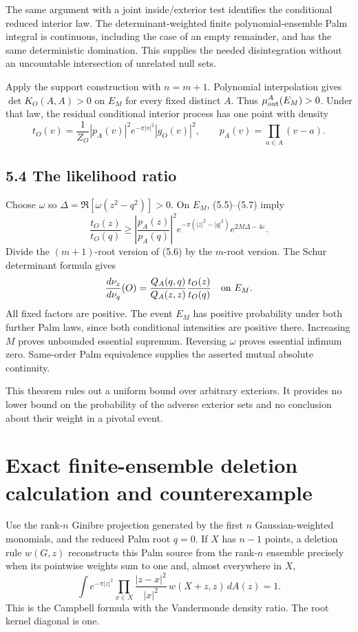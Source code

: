 \documentclass[11pt,a4paper]{article}
\theoremstyle{definition}
\theoremstyle{remark}
\numberwithin{equation}{section}
\begin{document}
The same argument with a joint inside/exterior test identifies the conditional reduced interior law. The determinant-weighted finite polynomial-ensemble Palm integral is continuous, including the case of an empty remainder, and has the same deterministic domination. This supplies the needed disintegration without an uncountable intersection of unrelated null sets.

Apply the support construction with \(n=m+1\). Polynomial interpolation gives \(\det K_O(A,A)>0\) on \(E_M\) for every fixed distinct \(A\). Thus \(\mu^A_{\rm out}(E_M)>0\). Under that law, the residual conditional interior process has one point with density \[
t_O(v)=\frac1{Z_O}
 |p_A(v)|^2e^{-\pi|v|^2}|g_O(v)|^2,\qquad
p_A(v)=\prod_{a\in A}(v-a).
\tag{5.7}
\]

\hypertarget{the-likelihood-ratio}{%
\subsection{5.4 The likelihood ratio}\label{the-likelihood-ratio}}

Choose \(\omega\) so \(\Delta=\Re[\omega(z^2-q^2)]>0\). On \(E_M\), (5.5)--(5.7) imply \[
\frac{t_O(z)}{t_O(q)}
\ge
\left|\frac{p_A(z)}{p_A(q)}\right|^2
 e^{-\pi(|z|^2-|q|^2)}e^{2M\Delta-4\varepsilon}.
\] Divide the \((m+1)\)-root version of (5.6) by the \(m\)-root version. The Schur determinant formula gives \[
\frac{d\nu_z}{d\nu_q}(O)
=\frac{Q_A(q,q)}{Q_A(z,z)}\frac{t_O(z)}{t_O(q)}
\quad\hbox{on }E_M.
\] All fixed factors are positive. The event \(E_M\) has positive probability under both further Palm laws, since both conditional intensities are positive there. Increasing \(M\) proves unbounded essential supremum. Reversing \(\omega\) proves essential infimum zero. Same-order Palm equivalence supplies the asserted mutual absolute continuity.

This theorem rules out a uniform bound over arbitrary exteriors. It provides no lower bound on the probability of the adverse exterior sets and no conclusion about their weight in a pivotal event.

\hypertarget{exact-finite-ensemble-deletion-calculation-and-counterexample}{%
\section{Exact finite-ensemble deletion calculation and counterexample}\label{exact-finite-ensemble-deletion-calculation-and-counterexample}}

Use the rank-\(n\) Ginibre projection generated by the first \(n\) Gaussian-weighted monomials, and the reduced Palm root \(q=0\). If \(X\) has \(n-1\) points, a deletion rule \(w(G,z)\) reconstructs this Palm source from the rank-\(n\) ensemble precisely when its pointwise weights sum to one and, almost everywhere in \(X\), \[
\int e^{-\pi|z|^2}
\prod_{x\in X}\frac{|z-x|^2}{|x|^2}\,
w(X+z,z)\,dA(z)=1.
\tag{6.1}
\] This is the Campbell formula with the Vandermonde density ratio. The root kernel diagonal is one.
\end{document}
